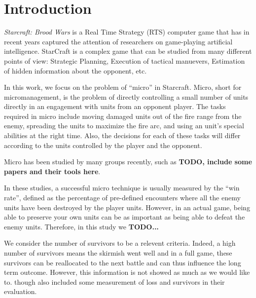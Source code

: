 \section{Introduction}\label{section:introduction}

\emph{Starcraft: Brood Wars} is a Real Time Strategy (RTS) computer
game that has in recent years captured the attention of researchers on
game-playing artificial intelligence. StarCraft is a complex game that
can be studied from many different points of view: Strategic Planning,
Execution of tactical manuevers, Estimation of hidden information
about the opponent, etc.

In this work, we focus on the problem of ``micro'' in
Starcraft. Micro, short for micromanagement, is the problem of
directly controlling a small number of units directly in an engagement
with units from an opponent player. The tasks required in micro
include moving damaged units out of the fire range from the enemy,
spreading the units to maximize the fire arc, and using an unit's
special abilities at the right time. Also, the decisions for each of
these tasks will differ according to the units controlled by the
player and the opponent.

Micro has been studied by many groups recently, such as {\bf TODO,
  include some papers and their tools here}.

In these studies, a successful micro technique is usually measured by
the ``win rate'', defined as the percentage of pre-defined encounters
where all the enemy units have been destroyed by the player
units. However, in an actual game, being able to preserve your own
units can be as important as being able to defeat the enemy
units. Therefore, in this study we {\bf TODO...}



We consider the number of survivors to be a relevent criteria.
Indeed, a high number of survivors means the skirmish went well
and in a full game, these survivors can be reallocated to the
next battle and can thus influence the long term outcome.
However, this information is not showed as much as we would like to. \citet{SiSuBa14}
though also included some measurement of loss
and survivors in their evaluation.
